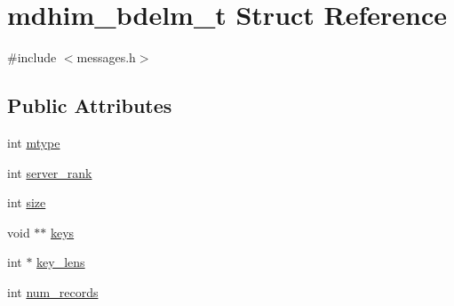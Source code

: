 \hypertarget{structmdhim__bdelm__t}{\section{mdhim\-\_\-bdelm\-\_\-t Struct Reference}
\label{structmdhim__bdelm__t}
}


{\ttfamily \#include $<$messages.\-h$>$}

\subsection*{Public Attributes}
\begin{DoxyCompactItemize}
\item 
int \hyperlink{structmdhim__bdelm__t_a9723fe671281596fa43c80b13ea7eb9c}{mtype}
\item 
int \hyperlink{structmdhim__bdelm__t_a5c455aeb5d7804c4d448d5b3f624c6e6}{server\-\_\-rank}
\item 
int \hyperlink{structmdhim__bdelm__t_a1c92bb6d1ffe28e7cd24aa2041f469da}{size}
\item 
void $\ast$$\ast$ \hyperlink{structmdhim__bdelm__t_a7e218a41a470e47c65040491f879985d}{keys}
\item 
int $\ast$ \hyperlink{structmdhim__bdelm__t_a12057b9c3f79456910521cd628b31415}{key\-\_\-lens}
\item 
int \hyperlink{structmdhim__bdelm__t_a3a51d42f3dee8ffd91aa208cdd2be0a3}{num\-\_\-records}
\end{DoxyCompactItemize}


